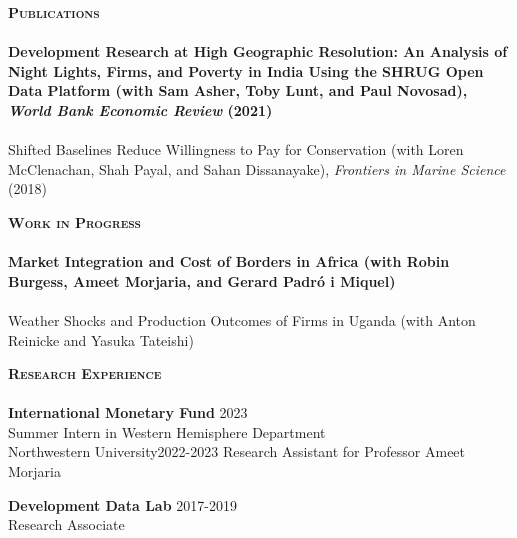 \documentclass[11pt]{article}
\newcommand{\lineunder}{\vspace*{-8pt} \\ \hspace*{-18pt} \hrulefill \\}
\newcommand{\header}[1]{{\hspace*{-15pt}\vspace*{6pt} \textsc{#1}} \vspace*{-6pt} \lineunder}
\newcommand{\schoolwithcourses}[4]{
 \textbf{#1} \hfill{#2}\\
    #3\\
\vspace*{5pt}
}
\begin{document}

\header{\textbf{Publications}}
\schoolwithcourses{Development Research at High Geographic Resolution: An Analysis of Night Lights, Firms, and Poverty in India Using the SHRUG Open Data Platform \textnormal{(with Sam Asher, Toby Lunt, and Paul Novosad), \textit{World Bank Economic Review} (2021)}}{}{~\vspace{-3mm}}  

\schoolwithcourses{Shifted Baselines Reduce Willingness to Pay for Conservation \textnormal{(with Loren McClenachan, Shah Payal, and Sahan Dissanayake), \textit{Frontiers in Marine Science} (2018)}}{}{~\vspace{-3mm}} 

\hfill{}

\newpage


\header{\textbf{Work in Progress}}

\schoolwithcourses{Market Integration and Cost of Borders in Africa \textnormal{(with Robin Burgess, Ameet Morjaria, and Gerard Padr\'{o} i Miquel)}}{}{~\vspace{-3mm}}

\schoolwithcourses{Weather Shocks and Production Outcomes of Firms in Uganda \textnormal{(with Anton Reinicke and Yasuka Tateishi)}}{}{~\vspace{-3mm}}{}




\header{\textbf{Research Experience}}
\schoolwithcourses{International Monetary Fund}{2023}{\hspace{2mm} Summer Intern in Western Hemisphere Department}

\schoolwithcourses{Northwestern University}{2022-2023}{\hspace{2mm} Research Assistant for Professor Ameet Morjaria}

\schoolwithcourses{Development Data Lab}{2017-2019}{\hspace{2mm} Research Associate}
\hfill{}
\vspace{1mm}
\end{document}
